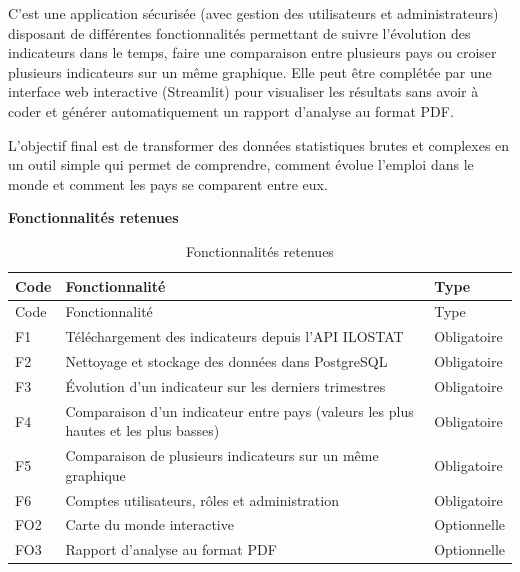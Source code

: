 \documentclass[
  french,
  12pt,
  letterpaper,
  DIV=11,
  numbers=noendperiod]{scrartcl}
\begin{document}
C'est une application sécurisée (avec gestion des utilisateurs et
administrateurs) disposant de différentes fonctionnalités permettant de
suivre l'évolution des indicateurs dans le temps, faire une comparaison
entre plusieurs pays ou croiser plusieurs indicateurs sur un même
graphique. Elle peut être complétée par une interface web interactive
(Streamlit) pour visualiser les résultats sans avoir à coder et générer
automatiquement un rapport d'analyse au format PDF.

L'objectif final est de transformer des données statistiques brutes et
complexes en un outil simple qui permet de comprendre, comment évolue
l'emploi dans le monde et comment les pays se comparent entre eux.

\textbf{Fonctionnalités retenues}

\begin{longtable}[]{@{}
  >{\raggedright\arraybackslash}p{}
  >{\raggedright\arraybackslash}p{}
  >{\raggedright\arraybackslash}p{}@{}}
\caption{Fonctionnalités retenues}\tabularnewline
\toprule\noalign{}
\begin{minipage}[b]{\linewidth}\raggedright
Code
\end{minipage} & \begin{minipage}[b]{\linewidth}\raggedright
Fonctionnalité
\end{minipage} & \begin{minipage}[b]{\linewidth}\raggedright
Type
\end{minipage} \\
\midrule\noalign{}
\endfirsthead
\toprule\noalign{}
\begin{minipage}[b]{\linewidth}\raggedright
Code
\end{minipage} & \begin{minipage}[b]{\linewidth}\raggedright
Fonctionnalité
\end{minipage} & \begin{minipage}[b]{\linewidth}\raggedright
Type
\end{minipage} \\
\midrule\noalign{}
\endhead
\bottomrule\noalign{}
\endlastfoot
F1 & Téléchargement des indicateurs depuis l'API ILOSTAT &
Obligatoire \\
F2 & Nettoyage et stockage des données dans PostgreSQL & Obligatoire \\
F3 & Évolution d'un indicateur sur les derniers trimestres &
Obligatoire \\
F4 & Comparaison d'un indicateur entre pays (valeurs les plus hautes et
les plus basses) & Obligatoire \\
F5 & Comparaison de plusieurs indicateurs sur un même graphique &
Obligatoire \\
F6 & Comptes utilisateurs, rôles et administration & Obligatoire \\
FO2 & Carte du monde interactive & Optionnelle \\
FO3 & Rapport d'analyse au format PDF & Optionnelle \\
\end{longtable}
\end{document}
